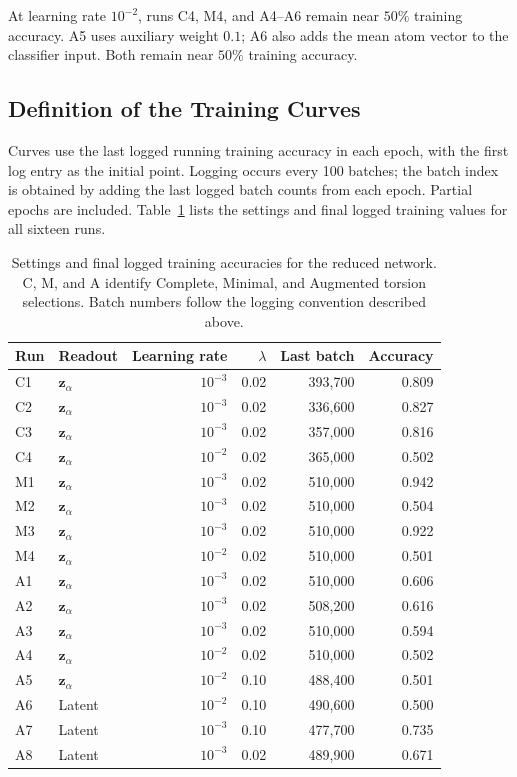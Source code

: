 \documentclass[%
 preprint,
superscriptaddress,
 amsmath,amssymb,
 aip,
 jcp,
]{revtex4-2}
\begin{document}
At learning rate $10^{-2}$, runs C4, M4, and A4--A6 remain near $50\%$ training accuracy.
A5 uses auxiliary weight $0.1$; A6 also adds the mean atom vector to the classifier input. Both remain near $50\%$ training accuracy.

\subsection{Definition of the Training Curves}

Curves use the last logged running training accuracy in each epoch, with the first log entry as the initial point.
Logging occurs every 100 batches; the batch index is obtained by adding the last logged batch counts from each epoch.
Partial epochs are included.
Table~\ref{tab:ml_curve_settings} lists the settings and final logged training values for all sixteen runs.

\begin{table}[htbp]
\centering
\caption{Settings and final logged training accuracies for the reduced network. C, M, and A identify Complete, Minimal, and Augmented torsion selections. Batch numbers follow the logging convention described above.}
\label{tab:ml_curve_settings}
\setlength{\tabcolsep}{6pt}
\begin{tabular}{llrrrr}
\hline
Run & Readout & Learning rate & $\lambda$ & Last batch & Accuracy \\
\hline
C1 & $\mathbf z_\alpha$ & $10^{-3}$ & 0.02 & 393,700 & 0.809 \\
C2 & $\mathbf z_\alpha$ & $10^{-3}$ & 0.02 & 336,600 & 0.827 \\
C3 & $\mathbf z_\alpha$ & $10^{-3}$ & 0.02 & 357,000 & 0.816 \\
C4 & $\mathbf z_\alpha$ & $10^{-2}$ & 0.02 & 365,000 & 0.502 \\
M1 & $\mathbf z_\alpha$ & $10^{-3}$ & 0.02 & 510,000 & 0.942 \\
M2 & $\mathbf z_\alpha$ & $10^{-3}$ & 0.02 & 510,000 & 0.504 \\
M3 & $\mathbf z_\alpha$ & $10^{-3}$ & 0.02 & 510,000 & 0.922 \\
M4 & $\mathbf z_\alpha$ & $10^{-2}$ & 0.02 & 510,000 & 0.501 \\
A1 & $\mathbf z_\alpha$ & $10^{-3}$ & 0.02 & 510,000 & 0.606 \\
A2 & $\mathbf z_\alpha$ & $10^{-3}$ & 0.02 & 508,200 & 0.616 \\
A3 & $\mathbf z_\alpha$ & $10^{-3}$ & 0.02 & 510,000 & 0.594 \\
A4 & $\mathbf z_\alpha$ & $10^{-2}$ & 0.02 & 510,000 & 0.502 \\
A5 & $\mathbf z_\alpha$ & $10^{-2}$ & 0.10 & 488,400 & 0.501 \\
A6 & Latent & $10^{-2}$ & 0.10 & 490,600 & 0.500 \\
A7 & Latent & $10^{-3}$ & 0.10 & 477,700 & 0.735 \\
A8 & Latent & $10^{-3}$ & 0.02 & 489,900 & 0.671 \\
\hline
\end{tabular}
\end{table}
\end{document}
